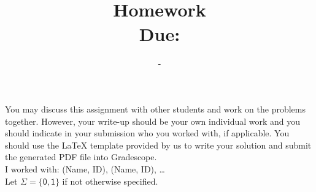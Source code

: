 \documentclass{article}
\title{
    \vspace{-0.4in}
    \textmd{\textbf{\hmwkClass \\ Homework \hmwkNo}}\\
    \normalsize\vspace{0.1in}\small{Due: \hmwkDueDate}\\
}
\author{\hmwkAuthorName\ -\ \hmwkAuthorID}
\date{}
\begin{document}
\maketitle
\thispagestyle{fancy}

You may discuss this assignment with other students and work
on the problems together. However, your write-up should be your own individual work and you should indicate in your submission who you worked with, if applicable. You should use the {\LaTeX} template provided by us to write your solution and submit the generated PDF file into Gradescope. \\

I worked with: (Name, ID), (Name, ID), \ldots \\

Let $\Sigma = \{\mathsf{0}, \mathsf{1}\}$ if not otherwise specified.
\end{document}
